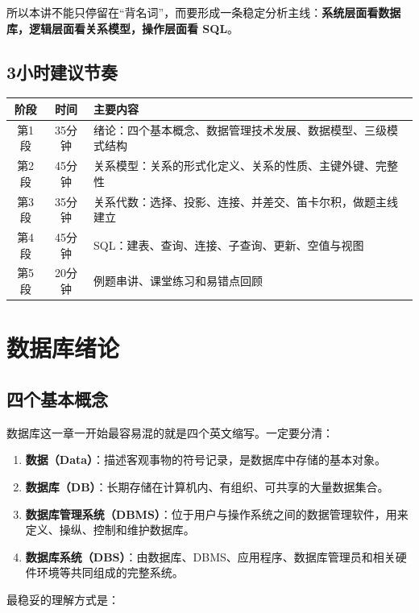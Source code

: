 \documentclass{../../note}
\begin{document}
所以本讲不能只停留在“背名词”，而要形成一条稳定分析主线：\textbf{系统层面看数据库，逻辑层面看关系模型，操作层面看 SQL}。

\subsection{3小时建议节奏}

\begin{center}
\begin{tabular}{|c|c|p{9cm}|}
\hline
阶段 & 时间 & 主要内容 \\
\hline
第1段 & 35分钟 & 绪论：四个基本概念、数据管理技术发展、数据模型、三级模式结构 \\
\hline
第2段 & 45分钟 & 关系模型：关系的形式化定义、关系的性质、主键外键、完整性 \\
\hline
第3段 & 35分钟 & 关系代数：选择、投影、连接、并差交、笛卡尔积，做题主线建立 \\
\hline
第4段 & 45分钟 & SQL：建表、查询、连接、子查询、更新、空值与视图 \\
\hline
第5段 & 20分钟 & 例题串讲、课堂练习和易错点回顾 \\
\hline
\end{tabular}
\end{center}

\section{数据库绪论}

\subsection{四个基本概念}

数据库这一章一开始最容易混的就是四个英文缩写。一定要分清：

\begin{enumerate}
  \item \textbf{数据（Data）}：描述客观事物的符号记录，是数据库中存储的基本对象。
  \item \textbf{数据库（DB）}：长期存储在计算机内、有组织、可共享的大量数据集合。
  \item \textbf{数据库管理系统（DBMS）}：位于用户与操作系统之间的数据管理软件，用来定义、操纵、控制和维护数据库。
  \item \textbf{数据库系统（DBS）}：由数据库、DBMS、应用程序、数据库管理员和相关硬件环境等共同组成的完整系统。
\end{enumerate}

最稳妥的理解方式是：
\end{document}
